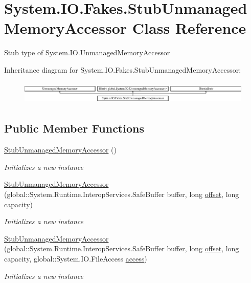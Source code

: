 \hypertarget{class_system_1_1_i_o_1_1_fakes_1_1_stub_unmanaged_memory_accessor}{\section{System.\-I\-O.\-Fakes.\-Stub\-Unmanaged\-Memory\-Accessor Class Reference}
\label{class_system_1_1_i_o_1_1_fakes_1_1_stub_unmanaged_memory_accessor}
}


Stub type of System.\-I\-O.\-Unmanaged\-Memory\-Accessor 


Inheritance diagram for System.\-I\-O.\-Fakes.\-Stub\-Unmanaged\-Memory\-Accessor\-:\begin{figure}[H]
\begin{center}
\leavevmode
\includegraphics[height=1.107814cm]{class_system_1_1_i_o_1_1_fakes_1_1_stub_unmanaged_memory_accessor}
\end{center}
\end{figure}
\subsection*{Public Member Functions}
\begin{DoxyCompactItemize}
\item 
\hyperlink{class_system_1_1_i_o_1_1_fakes_1_1_stub_unmanaged_memory_accessor_a742700e75ee1955a980d044646167f73}{Stub\-Unmanaged\-Memory\-Accessor} ()
\begin{DoxyCompactList}\small\item\em Initializes a new instance\end{DoxyCompactList}\item 
\hyperlink{class_system_1_1_i_o_1_1_fakes_1_1_stub_unmanaged_memory_accessor_ae993c2c2c538b2791384db429ea609a9}{Stub\-Unmanaged\-Memory\-Accessor} (global\-::\-System.\-Runtime.\-Interop\-Services.\-Safe\-Buffer buffer, long \hyperlink{jquery-1_810_82_8js_a4a9f594d20d927164551fc7fa4751a2f}{offset}, long capacity)
\begin{DoxyCompactList}\small\item\em Initializes a new instance\end{DoxyCompactList}\item 
\hyperlink{class_system_1_1_i_o_1_1_fakes_1_1_stub_unmanaged_memory_accessor_aa4f10760e00a6ff24081fa7342ac8e57}{Stub\-Unmanaged\-Memory\-Accessor} (global\-::\-System.\-Runtime.\-Interop\-Services.\-Safe\-Buffer buffer, long \hyperlink{jquery-1_810_82_8js_a4a9f594d20d927164551fc7fa4751a2f}{offset}, long capacity, global\-::\-System.\-I\-O.\-File\-Access \hyperlink{jquery-1_810_82-vsdoc_8js_a130ad18d21e14ee566dbf4eb185f2bda}{access})
\begin{DoxyCompactList}\small\item\em Initializes a new instance\end{DoxyCompactList}\end{DoxyCompactItemize}
